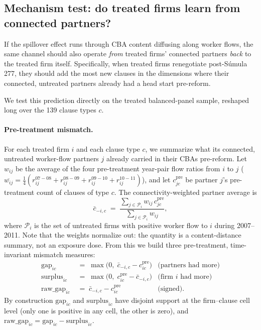 
\subsection{Mechanism test: do treated firms learn from connected partners?}
\label{sec:mechanism_test}

If the spillover effect runs through CBA content diffusing along worker
flows, the same channel should also operate \emph{from} treated firms'
connected partners \emph{back} to the treated firm itself. Specifically,
when treated firms renegotiate post-Súmula 277, they should add the most
new clauses in the dimensions where their connected, untreated partners
already had a head start pre-reform.

We test this prediction directly on the treated balanced-panel sample,
reshaped long over the 139 clause types $c$.

\paragraph{Pre-treatment mismatch.} For each treated firm $i$ and each
clause type $c$, we summarize what its connected, untreated worker-flow
partners $j$ already carried in their CBAs pre-reform. Let $w_{ij}$ be the
average of the four pre-treatment year-pair flow ratios from $i$ to $j$
($\overline{w_{ij}} = \tfrac14(r_{ij}^{07{-}08} + r_{ij}^{08{-}09} + r_{ij}^{09{-}10} + r_{ij}^{10{-}11})$),
and let $c^{\text{pre}}_{jc}$ be partner $j$'s pre-treatment count of
clauses of type $c$. The connectivity-weighted partner average is
%
\begin{equation}
  \bar{c}_{-i,c}
  \;=\; \frac{\sum_{j \in \mathcal{P}_i} w_{ij}\, c^{\text{pre}}_{jc}}
             {\sum_{j \in \mathcal{P}_i} w_{ij}},
\end{equation}
%
where $\mathcal{P}_i$ is the set of untreated firms with positive worker
flow to $i$ during 2007--2011. Note that the weights normalize out: the
quantity is a content-distance summary, not an exposure dose. From this we
build three pre-treatment, time-invariant mismatch measures:
%
\begin{align}
  \text{gap}_{ic}     &\;=\; \max\!\bigl(0,\; \bar{c}_{-i,c} - c^{\text{pre}}_{ic}\bigr)
  & \text{(partners had more)}\\
  \text{surplus}_{ic} &\;=\; \max\!\bigl(0,\; c^{\text{pre}}_{ic} - \bar{c}_{-i,c}\bigr)
  & \text{(firm $i$ had more)}\\
  \text{raw\_gap}_{ic} &\;=\; \bar{c}_{-i,c} - c^{\text{pre}}_{ic}
  & \text{(signed)}.
\end{align}
%
By construction $\text{gap}_{ic}$ and $\text{surplus}_{ic}$ have disjoint
support at the firm--clause cell level (only one is positive in any cell,
the other is zero), and $\text{raw\_gap}_{ic} = \text{gap}_{ic} - \text{surplus}_{ic}$.

